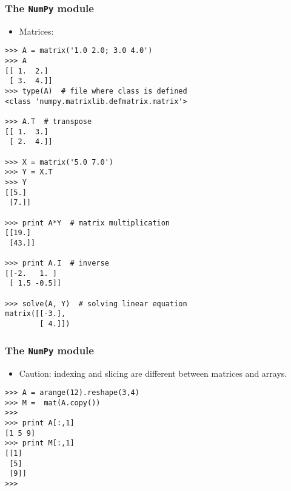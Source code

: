 \documentclass[handout]{beamer}
\numberwithin{equation}{section}
\begin{document}
\begin{frame}[fragile]
\frametitle{The {\tt NumPy} module}

\begin{itemize}
\item Matrices:
\end{itemize}

\begin{lstlisting}[name=ex2]
>>> A = matrix('1.0 2.0; 3.0 4.0')
>>> A
[[ 1.  2.]
 [ 3.  4.]]
>>> type(A)  # file where class is defined
<class 'numpy.matrixlib.defmatrix.matrix'>

>>> A.T  # transpose
[[ 1.  3.]
 [ 2.  4.]]

>>> X = matrix('5.0 7.0')
>>> Y = X.T
>>> Y
[[5.]
 [7.]]

>>> print A*Y  # matrix multiplication
[[19.]
 [43.]]

>>> print A.I  # inverse
[[-2.   1. ]
 [ 1.5 -0.5]]

>>> solve(A, Y)  # solving linear equation
matrix([[-3.],
        [ 4.]])
\end{lstlisting}
\end{frame}


\begin{frame}[fragile]
\frametitle{The {\tt NumPy} module}

\begin{itemize}
\item Caution: indexing and slicing are different between matrices and arrays.
\end{itemize}

\begin{lstlisting}[name=ex2]
>>> A = arange(12).reshape(3,4)
>>> M =  mat(A.copy())
>>> 
>>> print A[:,1]
[1 5 9]
>>> print M[:,1]
[[1]
 [5]
 [9]]
>>>
\end{lstlisting}
\end{frame}
\end{document}
